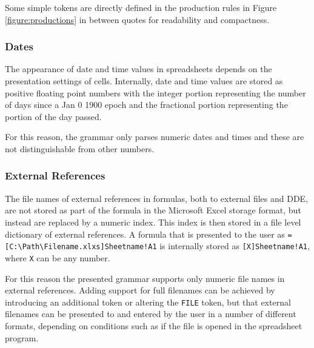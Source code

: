 \documentclass[conference]{IEEEtran}
\begin{document}
Some simple tokens are directly defined in the production rules in Figure \ref{figure:productions} in between quotes for readability and compactness.

\subsubsection{\textbf{Dates}}

The appearance of date and time values in spreadsheets depends on the presentation settings of cells. Internally, date and time values are stored as positive floating point numbers with the integer portion representing the number of days since a Jan 0 1900 epoch and the fractional portion representing the portion of the day passed.

For this reason, the grammar only parses numeric dates and times and these are not distinguishable from other numbers.

\subsubsection{\textbf{External References}}

The file names of external references in formulas, both to external files and DDE, are not stored as part of the formula in the Microsoft Excel storage format, but instead are replaced by a numeric index.
This index is then stored in a file level dictionary of external references.
A formula that is presented to the user as \texttt{=[C:\textbackslash Path\textbackslash Filename.xlxs]Sheetname!A1} is internally stored as \texttt{[X]Sheetname!A1}, where \texttt{X} can be any number.

For this reason the presented grammar supports only numeric file names in external references.
Adding support for full filenames can be achieved by introducing an additional token or altering the \texttt{FILE} token, but that external filenames can be presented to and entered by the user in a number of different formats, depending on conditions such as if the file is opened in the spreadsheet program.
\end{document}
